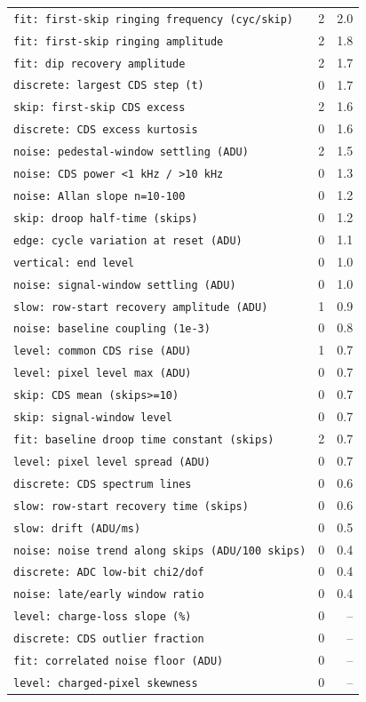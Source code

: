 \documentclass[10pt]{article}
\begin{document}
\begin{longtable}{>{\raggedright\arraybackslash}p{}rr}
\texttt{fit: first-skip ringing frequency (cyc/skip)} & 2 & 2.0 \\
\texttt{fit: first-skip ringing amplitude} & 2 & 1.8 \\
\texttt{fit: dip recovery amplitude} & 2 & 1.7 \\
\texttt{discrete: largest CDS step (t)} & 0 & 1.7 \\
\texttt{skip: first-skip CDS excess} & 2 & 1.6 \\
\texttt{discrete: CDS excess kurtosis} & 0 & 1.6 \\
\texttt{noise: pedestal-window settling (ADU)} & 2 & 1.5 \\
\texttt{noise: CDS power \textless{}1 kHz / \textgreater{}10 kHz} & 0 & 1.3 \\
\texttt{noise: Allan slope n=10-100} & 0 & 1.2 \\
\texttt{skip: droop half-time (skips)} & 0 & 1.2 \\
\texttt{edge: cycle variation at reset (ADU)} & 0 & 1.1 \\
\texttt{vertical: end level} & 0 & 1.0 \\
\texttt{noise: signal-window settling (ADU)} & 0 & 1.0 \\
\texttt{slow: row-start recovery amplitude (ADU)} & 1 & 0.9 \\
\texttt{noise: baseline coupling (1e-3)} & 0 & 0.8 \\
\texttt{level: common CDS rise (ADU)} & 1 & 0.7 \\
\texttt{level: pixel level max (ADU)} & 0 & 0.7 \\
\texttt{skip: CDS mean (skips\textgreater{}=10)} & 0 & 0.7 \\
\texttt{skip: signal-window level} & 0 & 0.7 \\
\texttt{fit: baseline droop time constant (skips)} & 2 & 0.7 \\
\texttt{level: pixel level spread (ADU)} & 0 & 0.7 \\
\texttt{discrete: CDS spectrum lines} & 0 & 0.6 \\
\texttt{slow: row-start recovery time (skips)} & 0 & 0.6 \\
\texttt{slow: drift (ADU/ms)} & 0 & 0.5 \\
\texttt{noise: noise trend along skips (ADU/100 skips)} & 0 & 0.4 \\
\texttt{discrete: ADC low-bit chi2/dof} & 0 & 0.4 \\
\texttt{noise: late/early window ratio} & 0 & 0.4 \\
\texttt{level: charge-loss slope (\%)} & 0 & -- \\
\texttt{discrete: CDS outlier fraction} & 0 & -- \\
\texttt{fit: correlated noise floor (ADU)} & 0 & -- \\
\texttt{level: charged-pixel skewness} & 0 & -- \\
\end{longtable}
\end{document}
